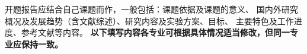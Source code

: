 %
%
%
%


开题报告应结合自己课题而作，一般包括：课题依据及课题的意义、
国内外研究概况及发展趋势（含文献综述）、研究内容及实验方案、目标、
主要特色及工作进度、参考文献等内容。
\textbf{以下填写内容各专业可根据具体情况适当修改，但同一专业应保持一致。}
\newpage